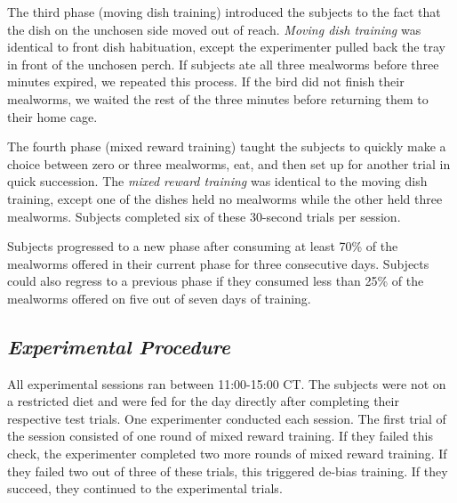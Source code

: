 \documentclass[
  ,pub,floatsintext]{apa6}
\begin{document}
The third phase (moving dish training) introduced the subjects to the fact that the dish on the unchosen side moved out of reach. \emph{Moving dish training} was identical to front dish habituation, except the experimenter pulled back the tray in front of the unchosen perch. If subjects ate all three mealworms before three minutes expired, we repeated this process. If the bird did not finish their mealworms, we waited the rest of the three minutes before returning them to their home cage.

The fourth phase (mixed reward training) taught the subjects to quickly make a choice between zero or three mealworms, eat, and then set up for another trial in quick succession. The \emph{mixed reward training} was identical to the moving dish training, except one of the dishes held no mealworms while the other held three mealworms. Subjects completed six of these 30-second trials per session.

Subjects progressed to a new phase after consuming at least 70\% of the mealworms offered in their current phase for three consecutive days. Subjects could also regress to a previous phase if they consumed less than 25\% of the mealworms offered on five out of seven days of training.

\hypertarget{experimental-procedure}{%
\subsection{\texorpdfstring{\emph{Experimental Procedure}}{Experimental Procedure}}\label{experimental-procedure}}

All experimental sessions ran between 11:00-15:00 CT. The subjects were not on a restricted diet and were fed for the day directly after completing their respective test trials. One experimenter conducted each session. The first trial of the session consisted of one round of mixed reward training. If they failed this check, the experimenter completed two more rounds of mixed reward training. If they failed two out of three of these trials, this triggered de-bias training. If they succeed, they continued to the experimental trials.
\end{document}
